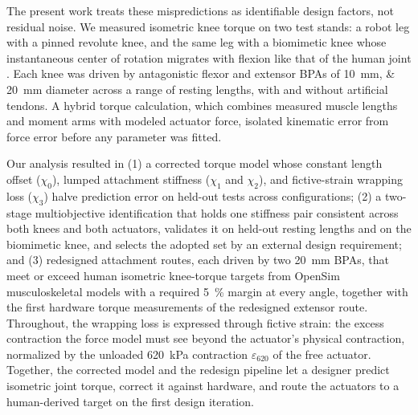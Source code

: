 The present work treats these mispredictions as identifiable design factors, not residual noise. We measured isometric knee torque on two test stands: a robot leg with a pinned revolute knee, and the same leg with a biomimetic knee whose instantaneous center of rotation migrates with flexion like that of the human joint \citep{steele_biomimetic_2018, steele_development_2017}. Each knee was driven by antagonistic flexor and extensor BPAs of \qtylist{10;20}{\mm} diameter across a range of resting lengths, with and without artificial tendons. A hybrid torque calculation, which combines measured muscle lengths and moment arms with modeled actuator force, isolated kinematic error from force error before any parameter was fitted.

Our analysis resulted in (1) a corrected torque model whose constant length offset ($\chi_0$), lumped attachment stiffness ($\chi_1$ and $\chi_2$), and fictive-strain wrapping loss ($\chi_3$) halve prediction error on held-out tests across configurations; (2) a two-stage multiobjective identification that holds one stiffness pair consistent across both knees and both actuators, validates it on held-out resting lengths and on the biomimetic knee, and selects the adopted set by an external design requirement; and (3) redesigned attachment routes, each driven by two \qty{20}{\mm} BPAs, that meet or exceed human isometric knee-torque targets from OpenSim musculoskeletal models \citep{seth_opensim_2018, delp_interactive_1990} with a required \qty{5}{\percent} margin at every angle, together with the first hardware torque measurements of the redesigned extensor route. Throughout, the wrapping loss is expressed through fictive strain: the excess contraction the force model must see beyond the actuator's physical contraction, normalized by the unloaded \qty{620}{\kPa} contraction $\varepsilon_{620}$ of the free actuator. Together, the corrected model and the redesign pipeline let a designer predict isometric joint torque, correct it against hardware, and route the actuators to a human-derived target on the first design iteration.
